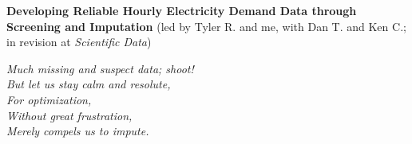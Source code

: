 \documentclass{article}
\begin{document}
\vspace{0.75cm}

\noindent
\textbf{Developing Reliable Hourly Electricity Demand Data through Screening and Imputation} (led by Tyler R. and me, with Dan T. and Ken C.; in revision at \textit{Scientific Data})\\

\vspace{0.25cm}

{\large
\noindent
\textit{Much missing and suspect data; shoot!\\
But let us stay calm and resolute,\\
\null \hspace{0.5cm} For optimization,\\
\null \hspace{0.5cm} Without great frustration,\\
Merely compels us to impute.}
}
\end{document}
